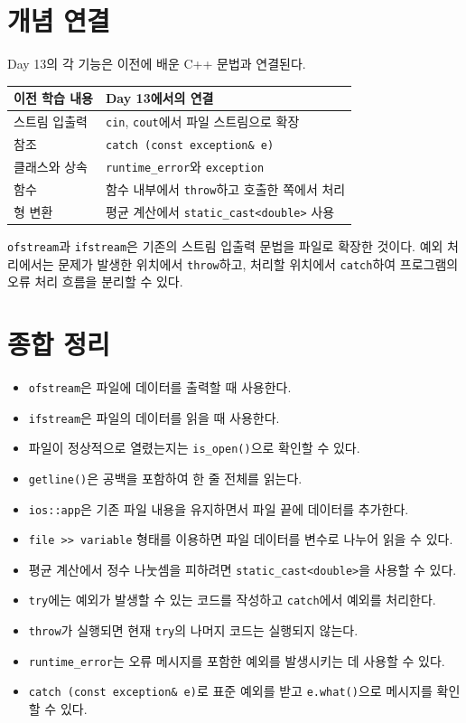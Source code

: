 \documentclass[11pt,a4paper]{article}
\begin{document}
\section{개념 연결}
Day 13의 각 기능은 이전에 배운 C++ 문법과 연결된다.

\begin{center}
\begin{tabular}{ll}
\toprule
이전 학습 내용 & Day 13에서의 연결 \\
\midrule
스트림 입출력 & \texttt{cin}, \texttt{cout}에서 파일 스트림으로 확장 \\
참조 & \texttt{catch (const exception\& e)} \\
클래스와 상속 & \texttt{runtime\_error}와 \texttt{exception} \\
함수 & 함수 내부에서 \texttt{throw}하고 호출한 쪽에서 처리 \\
형 변환 & 평균 계산에서 \texttt{static\_cast<double>} 사용 \\
\bottomrule
\end{tabular}
\end{center}

\begin{importantbox}
\texttt{ofstream}과 \texttt{ifstream}은 기존의 스트림 입출력 문법을 파일로 확장한 것이다.
예외 처리에서는 문제가 발생한 위치에서 \texttt{throw}하고,
처리할 위치에서 \texttt{catch}하여 프로그램의 오류 처리 흐름을 분리할 수 있다.
\end{importantbox}

\section{종합 정리}
\begin{importantbox}
\begin{itemize}[leftmargin=1.5em]
    \item \texttt{ofstream}은 파일에 데이터를 출력할 때 사용한다.
    \item \texttt{ifstream}은 파일의 데이터를 읽을 때 사용한다.
    \item 파일이 정상적으로 열렸는지는 \texttt{is\_open()}으로 확인할 수 있다.
    \item \texttt{getline()}은 공백을 포함하여 한 줄 전체를 읽는다.
    \item \texttt{ios::app}은 기존 파일 내용을 유지하면서 파일 끝에 데이터를 추가한다.
    \item \texttt{file >> variable} 형태를 이용하면 파일 데이터를 변수로 나누어 읽을 수 있다.
    \item 평균 계산에서 정수 나눗셈을 피하려면 \texttt{static\_cast<double>}을 사용할 수 있다.
    \item \texttt{try}에는 예외가 발생할 수 있는 코드를 작성하고 \texttt{catch}에서 예외를 처리한다.
    \item \texttt{throw}가 실행되면 현재 \texttt{try}의 나머지 코드는 실행되지 않는다.
    \item \texttt{runtime\_error}는 오류 메시지를 포함한 예외를 발생시키는 데 사용할 수 있다.
    \item \texttt{catch (const exception\& e)}로 표준 예외를 받고 \texttt{e.what()}으로 메시지를 확인할 수 있다.
\end{itemize}
\end{importantbox}
\end{document}
